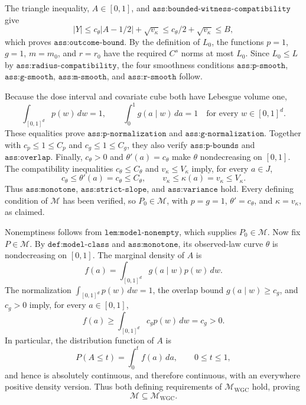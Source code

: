 The triangle inequality, \(A\in[0,1]\), and \(\texttt{ass:bounded-witness-compatibility}\) give
\[
|Y|
\le c_{\theta}|A-1/2|+\sqrt{v_{\kappa}}
\le c_{\theta}/2+\sqrt{v_{\kappa}}
\le B,
\]
which proves \(\texttt{ass:outcome-bound}\). By the definition of \(L_0\), the functions \(p=1\), \(g=1\), \(m=m_0\), and \(r=r_0\) have the required \(C^s\) norms at most \(L_0\). Since \(L_0\le L\) by \(\texttt{ass:radius-compatibility}\), the four smoothness conditions \(\texttt{ass:p-smooth}\), \(\texttt{ass:g-smooth}\), \(\texttt{ass:m-smooth}\), and \(\texttt{ass:r-smooth}\) follow.

Because the dose interval and covariate cube both have Lebesgue volume one,
\[
\int_{[0,1]^d}p(w)\,dw=1,
\qquad
\int_0^1g(a\mid w)\,da=1
\quad\text{for every }w\in[0,1]^d.
\]
These equalities prove \(\texttt{ass:p-normalization}\) and \(\texttt{ass:g-normalization}\). Together with \(c_p\le1\le C_p\) and \(c_g\le1\le C_g\), they also verify \(\texttt{ass:p-bounds}\) and \(\texttt{ass:overlap}\). Finally, \(c_{\theta}>0\) and \(\theta'(a)=c_{\theta}\) make \(\theta\) nondecreasing on \([0,1]\). The compatibility inequalities \(c_{\theta}\le C_{\theta}\) and \(v_{\kappa}\le V_{\kappa}\) imply, for every \(a\in J\),
\[
c_{\theta}\le\theta'(a)=c_{\theta}\le C_{\theta},
\qquad
v_{\kappa}\le\kappa(a)=v_{\kappa}\le V_{\kappa}.
\]
Thus \(\texttt{ass:monotone}\), \(\texttt{ass:strict-slope}\), and \(\texttt{ass:variance}\) hold. Every defining condition of \(\mathcal M\) has been verified, so \(P_0\in\mathcal M\), with \(p=g=1\), \(\theta'=c_{\theta}\), and \(\kappa=v_{\kappa}\), as claimed.

Nonemptiness follows from \(\texttt{lem:model-nonempty}\), which supplies \(P_0\in\mathcal M\). Now fix \(P\in\mathcal M\). By \(\texttt{def:model-class}\) and \(\texttt{ass:monotone}\), its observed-law curve \(\theta\) is nondecreasing on \([0,1]\). The marginal density of \(A\) is
\[
f(a)=\int_{[0,1]^d}g(a\mid w)p(w)\,dw.
\]
The normalization \(\int_{[0,1]^d}p(w)\,dw=1\), the overlap bound \(g(a\mid w)\ge c_g\), and \(c_g>0\) imply, for every \(a\in[0,1]\),
\[
f(a)
\ge \int_{[0,1]^d}c_g p(w)\,dw
=c_g>0.
\]
In particular, the distribution function of \(A\) is
\[
P(A\le t)=\int_0^t f(a)\,da,
\qquad 0\le t\le1,
\]
and hence is absolutely continuous, and therefore continuous, with an everywhere positive density version. Thus both defining requirements of \(\mathcal M_{\mathrm{WGC}}\) hold, proving
\[
\mathcal M\subseteq\mathcal M_{\mathrm{WGC}}.
\]

